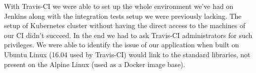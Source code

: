 With Travis-CI we were able to set up the whole environment we’ve had on Jenkins along with the
integration tests setup we were previously lacking. The setup of Kubernetes cluster without having 
the direct access to the machines of our CI didn’t succeed. In the end we had to ask Travis-CI 
administrators for such privileges. We were able to identify the issue of our application when 
built on Ubuntu Linux (16.04 used by Travis-CI) would link to the standard libraries, not present 
on the Alpine Linux (used as a Docker image base). 

